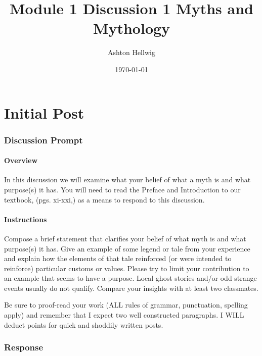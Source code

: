 \documentclass[12pt]{article}
\title{%
    Module 1 Discussion 1%
    \large{Myths and Mythology}
  }
\author{Ashton Hellwig}
\date{\today}
\theoremstyle{definition}
\theoremstyle{plain}
\begin{document}
  \maketitle
  \tableofcontents
  \newpage


  \part{Initial Post}

    \section{Discussion Prompt}
      \begin{mdframed}
        \subsection{Overview}
          In this discussion we will examine what your belief of what a myth is
            and what purpose(s) it has.  You will need to read the Preface and
            Introduction to our textbook, (pgs. xi-xxi,) as a means to respond
            to this discussion.

        \subsection{Instructions}
          Compose a brief statement that clarifies your belief of what myth is
            and what purpose(s) it has. Give an example of some legend or tale
            from your experience and explain how the elements of that tale
            reinforced (or were intended to reinforce) particular customs or
            values. Please try to limit your contribution to an example that
            seems to have a purpose. Local ghost stories and/or odd strange
            events usually do not qualify. Compare your insights with at least
            two classmates.

          Be sure to proof-read your work (ALL rules of grammar, punctuation,
            spelling apply) and remember that I expect two well constructed
            paragraphs. I WILL deduct points for quick and shoddily written
            posts.
      \end{mdframed}

    \section{Response}
\end{document}

